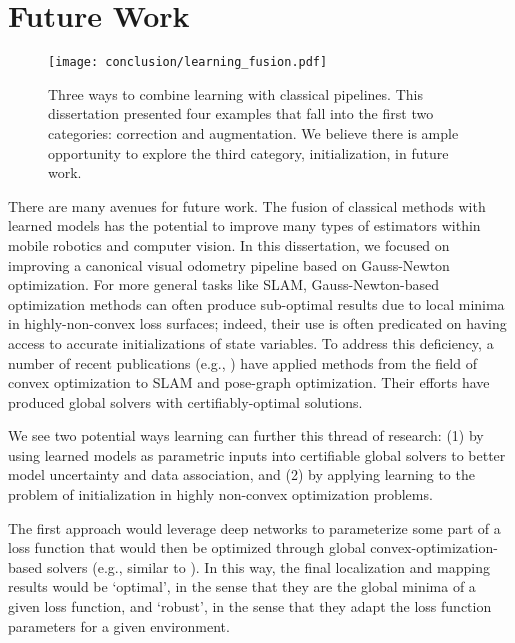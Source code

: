 \section{Future Work}

\begin{figure}[h!]
\begin{center}
		\texttt{[image: conclusion/learning\_fusion.pdf]}
		\caption{Three ways to combine learning with classical pipelines. This dissertation presented four examples that fall into the first two categories: correction and augmentation. We believe there is ample opportunity to explore the third category, initialization, in future work.}
  	\label{fig:conc_learning_fusion}
\end{center}
\end{figure}


There are many avenues for future work. The fusion of classical methods with learned models has the potential to improve many types of estimators within mobile robotics and computer vision. In this dissertation, we focused on improving a canonical visual odometry pipeline based on Gauss-Newton optimization. For more general tasks like SLAM, Gauss-Newton-based optimization methods can often produce sub-optimal results due to local minima in highly-non-convex loss surfaces; indeed, their use is often predicated on having access to accurate initializations of state variables. To address this deficiency, a number of recent publications (e.g., \cite{Rosen2019-kk}) have applied methods from the field of convex optimization to SLAM and pose-graph optimization. Their efforts have produced global solvers with certifiably-optimal solutions. 

We see two potential ways learning can further this thread of research: (1) by using learned models as parametric inputs into certifiable global solvers to better model uncertainty and data association, and (2) by applying learning to the problem of initialization in highly non-convex optimization problems.

The first approach would leverage deep networks to parameterize some part of a loss function that would then be optimized through global convex-optimization-based solvers (e.g., similar to \cite{amos2017optnet}). In this way, the final localization and mapping results would be ‘optimal’, in the sense that they are the global minima of a given loss function, and ‘robust’, in the sense that they adapt the loss function parameters for a given environment.

